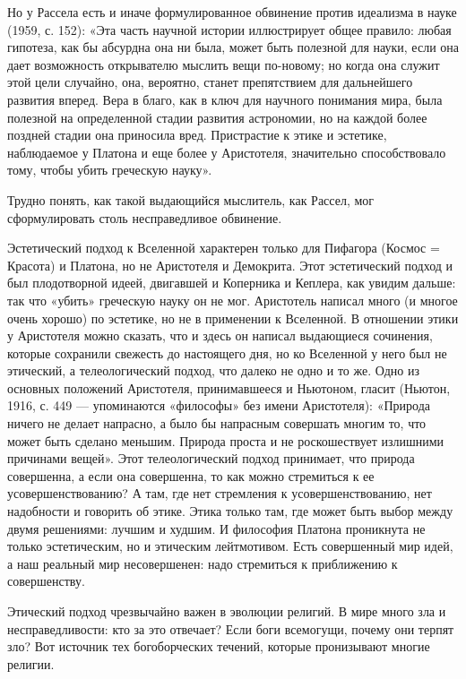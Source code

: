 Но у Рассела есть и иначе формулированное обвинение против
идеализма в науке (1959, с. 152): «Эта часть научной истории
иллюстрирует общее правило: любая гипотеза, как бы абсурдна она ни
была, может быть полезной для науки, если она дает возможность
открывателю мыслить вещи по-новому; но когда она служит этой цели
случайно, она, вероятно, станет препятствием для дальнейшего развития
вперед. Вера в благо, как в ключ для научного понимания мира, была
полезной на определенной стадии развития астрономии, но на каждой
более поздней стадии она приносила вред. Пристрастие к этике и
эстетике, наблюдаемое у Платона и еще более у Аристотеля, значительно
способствовало тому, чтобы убить греческую науку».

Трудно понять, как такой выдающийся мыслитель, как Рассел, мог
сформулировать столь несправедливое обвинение.

Эстетический подход к Вселенной характерен только для Пифагора (Космос
= Красота) и Платона, но не Аристотеля и Демокрита. Этот эстетический
подход и был плодотворной идеей, двигавшей и Коперника и Кеплера, как
увидим дальше: так что «убить» греческую науку он не мог. Аристотель
написал много (и многое очень хорошо) по эстетике, но не в применении
к Вселенной. В отношении этики у Аристотеля можно сказать, что и здесь
он написал выдающиеся сочинения, которые сохранили свежесть до
настоящего дня, но ко Вселенной у него был не этический, а
телеологический подход, что далеко не одно и то же. Одно из основных
положений Аристотеля, принимавшееся и Ньютоном, гласит (Ньютон, 1916,
с. 449 --- упоминаются «философы» без имени Аристотеля): «Природа
ничего не делает напрасно, а было бы напрасным совершать многим то,
что может быть сделано меньшим. Природа проста и не роскошествует
излишними причинами вещей». Этот телеологический подход принимает, что
природа совершенна, а если она совершенна, то как можно стремиться к
ее усовершенствованию? А там, где нет стремления к усовершенствованию,
нет надобности и говорить об этике. Этика только там, где может быть
выбор между двумя решениями: лучшим и худшим. И философия Платона
проникнута не только эстетическим, но и этическим лейтмотивом. Есть
совершенный мир идей, а наш реальный мир несовершенен: надо стремиться
к приближению к совершенству.

Этический подход чрезвычайно важен в эволюции религий. В мире много
зла и несправедливости: кто за это отвечает? Если боги всемогущи,
почему они терпят зло? Вот источник тех богоборческих течений, которые
пронизывают многие религии.

